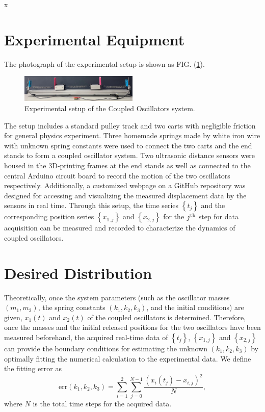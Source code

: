 x\documentclass[12pt, a4paper, reprint, nofootinbib, twoside,  showkeys]{revtex4-1}
\begin{document}
\section{Experimental Equipment}
	The photograph of the experimental setup is shown as FIG. (\ref{fig:exp-system}).
	\begin{figure}[h]
	\centering
	\includegraphics[width=0.5\textwidth]{image/system_cleanup.jpg}
	\caption{Experimental setup of the Coupled Oscillators system.}
	\label{fig:exp-system}
	\end{figure}
	The setup includes a standard pulley track and two carts with negligible friction for general physics experiment. Three homemade springs made by white iron wire with unknown spring constants were used to connect the two carts and the end stands to form a coupled oscillator system. Two ultrasonic distance sensors were housed in the 3D-printing frames at the end stands as well as connected to the central Arduino circuit board to record the motion of the two oscillators respectively. Additionally, a customized webpage on a GitHub repository was designed for accessing and visualizing the measured displacement data by the sensors in real time. 
	Through this setup,  the time series $\left\{t_j\right\}$ and the corresponding position series $\left\{x_{1,j}\right\}$ and $\left\{x_{2,j}\right\}$ for the $j^{\rm th}$ step for data acquisition can be measured and recorded to characterize the dynamics of coupled oscillators. 

\section{Desired Distribution}
Theoretically, once the system parameters (such as the oscillator masses $\left(m_1,m_2\right)$, the spring constants $\left(k_1,k_2,k_3\right)$, and the initial conditions) are given, $x_1\left(t\right)$ and $x_2\left(t\right)$ of the coupled oscillators is determined. Therefore, once the masses and the initial released positions for the two oscillators have been measured beforehand, the acquired real-time data of $\left\{t_j\right\}$, $\left\{x_{1,j}\right\}$ and $\left\{x_{2,j}\right\}$ can provide the boundary conditions for estimating the unknown $\left(k_1,k_2,k_3\right)$ 
by optimally fitting the numerical calculation to the experimental data. We define the fitting error as
\begin{equation}
\mathrm{err}\left(k_1,k_2,k_3\right) = \sum_{i=1}^{2}\sum_{j=0}^{N-1}\frac{\left(x_i\left(t_j\right) - x_{i,j}\right)^2}{N},
\end{equation}
where $N$ is the total time steps for the acquired data.
\end{document}
